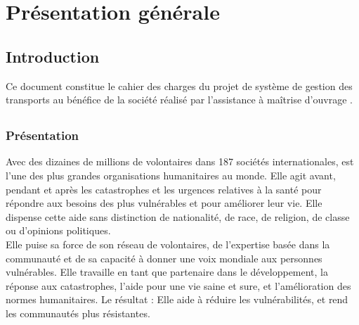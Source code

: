 \chapter{Présentation générale}

\section{Introduction}
Ce document constitue le cahier des charges du projet de système de gestion des transports au bénéfice de la société \mo réalisé par l'assistance à maîtrise d'ouvrage \amo.

\section{\mo}

\subsection{Présentation}
Avec des dizaines de millions de volontaires dans 187 sociétés internationales, \mo est l'une des plus grandes organisations humanitaires au monde. Elle agit avant, pendant et après les catastrophes et les urgences relatives à la santé pour répondre aux besoins des plus vulnérables et pour améliorer leur vie. Elle dispense cette aide sans distinction de nationalité, de race, de religion, de classe ou d'opinions politiques.
\\
Elle puise sa force de son réseau de volontaires, de l'expertise basée dans la communauté et de sa capacité à donner une voix mondiale aux personnes vulnérables. Elle travaille en tant que partenaire dans le développement, la réponse aux catastrophes, l'aide pour une vie saine et sure, et l'amélioration des normes humanitaires. Le résultat : Elle aide à réduire les vulnérabilités, et rend les communautés plus résistantes.

